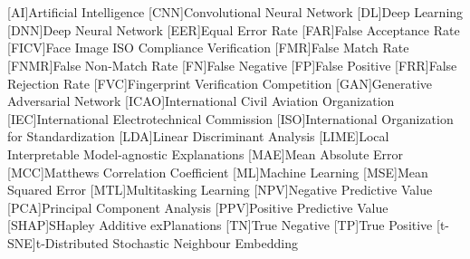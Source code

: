 \section*{} 

\begin{acronym}[FNMR]
[AI]{Artificial Intelligence}
[CNN]{Convolutional Neural Network}
[DL]{Deep Learning}
[DNN]{Deep Neural Network}
[EER]{Equal Error Rate}
[FAR]{False Acceptance Rate}
[FICV]{Face Image ISO Compliance Verification}
[FMR]{False Match Rate}
[FNMR]{False Non-Match Rate}
[FN]{False Negative}
[FP]{False Positive}
[FRR]{False Rejection Rate}
[FVC]{Fingerprint Verification Competition}
[GAN]{Generative Adversarial Network}
[ICAO]{International Civil Aviation Organization}
[IEC]{International Electrotechnical Commission}
[ISO]{International Organization for Standardization}
[LDA]{Linear Discriminant Analysis}
[LIME]{Local Interpretable Model-agnostic Explanations}
[MAE]{Mean Absolute Error}
[MCC]{Matthews Correlation Coefficient}
[ML]{Machine Learning}
[MSE]{Mean Squared Error}
[MTL]{Multitasking Learning}
[NPV]{Negative Predictive Value}
[PCA]{Principal Component Analysis}
[PPV]{Positive Predictive Value}
[SHAP]{SHapley Additive exPlanations}
[TN]{True Negative}
[TP]{True Positive}
[t-SNE]{t-Distributed Stochastic Neighbour Embedding}
\end{acronym}


